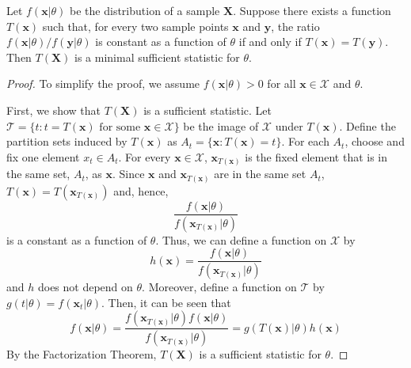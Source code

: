 \begin{theorem}
Let $f(\mathbf{x}|\theta)$ be the distribution of a sample $\mathbf{X}$.
Suppose there exists a function $T(\mathbf{x})$ such that, for every two sample points $\mathbf{x}$ and $\mathbf{y}$, the ratio $f(\mathbf{x}|\theta)/f(\mathbf{y}|\theta)$ is constant as a function of $\theta$ if and only if $T(\mathbf{x}) = T(\mathbf{y})$.
Then $T(\mathbf{X})$ is a minimal sufficient statistic for $\theta$.
\end{theorem}
\begin{proof}
To simplify the proof, we assume $f(\mathbf{x}|\theta) > 0$ for all $\mathbf{x} \in \mathcal{X}$ and $\theta$.

First, we show that $T(\mathbf{X})$ is a sufficient statistic.
Let $\mathcal{T} = \{ t : t=T(\mathbf{x}) \text{ for some } \mathbf{x} \in \mathcal{X} \}$ be the image of $\mathcal{X}$ under $T(\mathbf{x})$.
Define the partition sets induced by $T(\mathbf{x})$ as $A_t = \{ \mathbf{x} : T(\mathbf{x}) = t \}$.
For each $A_t$, choose and fix one element $x_t \in A_t$.
For every $\mathbf{x} \in \mathcal{X}$, $\mathbf{x}_{T(\mathbf{x})}$ is the fixed element that is in the same set, $A_t$, as $\mathbf{x}$.
Since $\mathbf{x}$ and  $\mathbf{x}_{T(\mathbf{x})}$ are in the same set $A_t$, $T(\mathbf{x}) = T(\mathbf{x}_{T(\mathbf{x})})$ and, hence,
\begin{equation*}
\frac{ f(\mathbf{x}|\theta) }{ f \left( \mathbf{x}_{T(\mathbf{x})} | \theta \right) }
\end{equation*}
is a constant as a function of $\theta$.
Thus, we can define a function on $\mathcal{X}$ by
\begin{equation*}
h(\mathbf{x}) = \frac{ f(\mathbf{x}|\theta) }{ f \left( \mathbf{x}_{T(\mathbf{x})} | \theta \right) }
\end{equation*}
and $h$ does not depend on $\theta$.
Moreover, define a function on $\mathcal{T}$ by $g(t|\theta) = f(\mathbf{x}_t|\theta)$.
Then, it can be seen that
\begin{equation*}
f(\mathbf{x}|\theta)
= \frac{ f \left( \mathbf{x}_{T(\mathbf{x})} | \theta \right)
f(\mathbf{x}|\theta) }
{ f \left( \mathbf{x}_{T(\mathbf{x})} | \theta \right) }
= g(T(\mathbf{x})|\theta) h(\mathbf{x})
\end{equation*}
By the Factorization Theorem, $T(\mathbf{X})$ is a sufficient statistic for $\theta$.


\end{proof}
